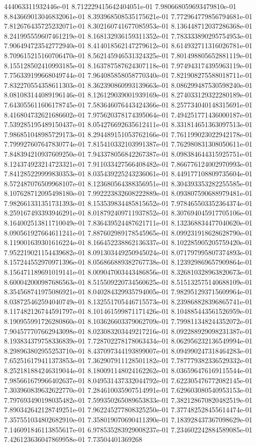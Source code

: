444063311932446e-01	8.712229415642404051e-01	7.980668059693479810e-01	8.843669013046832061e-01	8.393968508535175621e-01	7.772964779856794681e-01	7.812676435725232071e-01	8.302160741677085953e-01	8.136448712037286368e-01	8.241995559607461219e-01	8.168132936159311352e-01	7.783333890295754953e-01	7.906494723542772940e-01	8.414018562147279612e-01	8.614932711316026781e-01	8.709615215160706470e-01	8.562145946531324325e-01	7.801498805652881119e-01	8.155128502410993185e-01	8.163787587624307118e-01	7.974943174395963119e-01	7.756339199668049744e-01	7.964085858058770340e-01	7.821908275588018711e-01	7.832270554358611303e-01	8.362390860993139663e-01	8.086299487530598240e-01	8.081083144089196146e-01	8.126129039001939169e-01	8.274033129322280189e-01	7.643055611606178745e-01	7.583646076443424366e-01	8.257734040148315691e-01	8.416804732621686602e-01	7.975620378174395064e-01	7.494251771436000187e-01	7.539285195489150437e-01	8.054276692635612411e-01	8.331814651363097513e-01	7.986851048985729173e-01	8.294489151053762166e-01	7.761199023022942178e-01	7.799927607647830774e-01	7.815410332103991387e-01	7.762980831308050611e-01	7.848394210937609250e-01	7.943378056842267387e-01	8.098384644315925751e-01	8.124374923214723321e-01	7.911033427566408482e-01	7.866776124002970993e-01	7.841285229999830353e-01	8.035439225243236061e-01	8.449177108809735604e-01	8.572487076509968107e-01	8.123680564388356951e-01	8.304393353282255585e-01	8.107628712095498180e-01	7.992223832608222889e-01	8.093807590688979481e-01	7.982661331351731393e-01	8.153539834485815652e-01	7.978465503352364374e-01	8.259167493393946291e-01	8.018792409711937852e-01	8.307694045917705106e-01	8.164002513811710049e-01	7.836439524487621711e-01	8.132368834477040620e-01	8.090561927664611241e-01	7.887602989178545965e-01	8.099231918628628790e-01	8.119001639301616224e-01	8.166452238862136337e-01	8.102285905205759420e-01	7.952219021154439682e-01	8.091303449250945024e-01	8.071797995807374893e-01	8.157244552970971396e-01	8.056866889382767738e-01	8.123929869657909864e-01	8.156471189691019141e-01	8.009047003443486856e-01	8.326810328963820673e-01	8.600042000987686563e-01	8.515509220734560625e-01	8.515132575140688109e-01	8.354568741975086921e-01	8.040284329935794005e-01	7.982951293715609964e-01	8.038725462594040749e-01	8.132551705446715573e-01	8.239868828396865741e-01	8.117482126744591797e-01	8.101461599871171426e-01	8.104885443561526959e-01	8.190955991726280860e-01	8.103626603379062709e-01	7.799811348244352072e-01	7.904577707662943098e-01	8.023083203449217216e-01	8.092288929098231387e-01	8.193834379758336839e-01	7.728702278178063434e-01	8.062956232136549994e-01	8.298963802955253710e-01	8.437097344193899007e-01	8.094990247318464283e-01	7.652516179411373853e-01	7.362907911128501182e-01	7.787779382336529332e-01	8.252181884246319044e-01	8.180091148024162262e-01	8.036596476169115544e-01	7.985661679966402637e-01	8.049531437332044792e-01	7.622305476772082145e-01	7.303960839632622770e-01	7.284610035907514991e-01	7.629603080540953153e-01	7.797693490198035482e-01	7.599350265089653833e-01	7.382128670820482519e-01	7.890342642128749251e-01	7.962245277808325250e-01	7.377482528455614474e-01	7.357551034802682910e-01	7.358019070690411390e-01	7.183928437367098629e-01	7.146091846113855617e-01	6.978535283929008237e-01	7.234602242884589085e-01	7.426123636047869958e-01	7.73504401369268